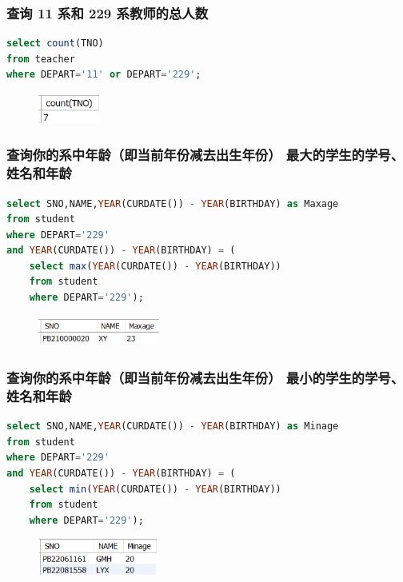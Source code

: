 \documentclass{ctexart}
\begin{document}
\subsubsection{查询 11 系和 229 系教师的总人数}
\begin{lstlisting}[language=sql]
select count(TNO)
from teacher 
where DEPART='11' or DEPART='229';
\end{lstlisting}
\begin{figure}[H]
	\centering 
	\includegraphics[height=1cm,width=2cm]{27.png}
	\end{figure}
\subsubsection{查询你的系中年龄（即当前年份减去出生年份） 最大的学生的学号、姓名和年龄}
\begin{lstlisting}[language=sql]
select SNO,NAME,YEAR(CURDATE()) - YEAR(BIRTHDAY) as Maxage
from student
where DEPART='229' 
and YEAR(CURDATE()) - YEAR(BIRTHDAY) = (
	select max(YEAR(CURDATE()) - YEAR(BIRTHDAY))
	from student
	where DEPART='229');
\end{lstlisting}
\begin{figure}[H]
	\centering 
	\includegraphics[height=1cm,width=4cm]{28.png}
	\end{figure}
\subsubsection{查询你的系中年龄（即当前年份减去出生年份） 最小的学生的学号、姓名和年龄}
\begin{lstlisting}[language=sql]
select SNO,NAME,YEAR(CURDATE()) - YEAR(BIRTHDAY) as Minage
from student
where DEPART='229' 
and YEAR(CURDATE()) - YEAR(BIRTHDAY) = (
	select min(YEAR(CURDATE()) - YEAR(BIRTHDAY))
    from student
    where DEPART='229');
\end{lstlisting}
\begin{figure}[H]
	\centering 
	\includegraphics[height=1.2cm,width=4cm]{29.png}
	\end{figure}
\end{document}
